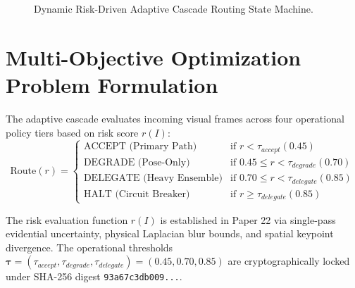 \documentclass[conference]{IEEEtran}
\begin{document}
\begin{figure}[htbp]
\centering
{}
\caption{Dynamic Risk-Driven Adaptive Cascade Routing State Machine.}
\label{fig:cascade}
\end{figure}

\section{Multi-Objective Optimization Problem Formulation}
The adaptive cascade evaluates incoming visual frames across four operational policy tiers based on risk score $r(I)$:
\begin{equation}
\text{Route}(r) = 
\begin{cases} 
\text{ACCEPT (Primary Path)} & \text{if } r < \tau_{accept} (0.45) \\
\text{DEGRADE (Pose-Only)} & \text{if } 0.45 \le r < \tau_{degrade} (0.70) \\
\text{DELEGATE (Heavy Ensemble)} & \text{if } 0.70 \le r < \tau_{delegate} (0.85) \\
\text{HALT (Circuit Breaker)} & \text{if } r \ge \tau_{delegate} (0.85)
\end{cases}
\end{equation}

The risk evaluation function $r(I)$ is established in Paper 22 \cite{b5} via single-pass evidential uncertainty, physical Laplacian blur bounds, and spatial keypoint divergence. The operational thresholds $\boldsymbol{\tau} = (\tau_{accept}, \tau_{degrade}, \tau_{delegate}) = (0.45, 0.70, 0.85)$ are cryptographically locked under SHA-256 digest \texttt{93a67c3db009...}.
\end{document}
